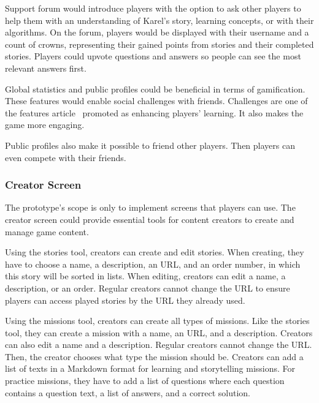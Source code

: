Support forum would introduce players with the option to ask other players to help them with an understanding of Karel's story, learning concepts, or with their algorithms.
On the forum, players would be displayed with their username and a count of crowns, representing their gained points from stories and their completed stories.
Players could upvote questions and answers so people can see the most relevant answers first.

Global statistics and public profiles could be beneficial in terms of gamification.
These features would enable social challenges with friends.
Challenges are one of the features article~\cite{nand_2019_engaging} promoted as enhancing players' learning.
It also makes the game more engaging.

Public profiles also make it possible to friend other players.
Then players can even compete with their friends.

\subsubsection{Creator Screen}

The prototype's scope is only to implement screens that players can use.
The creator screen could provide essential tools for content creators to create and manage game content.

Using the stories tool, creators can create and edit stories.
When creating, they have to choose a name, a description, an URL, and an order number, in which this story will be sorted in lists.
When editing, creators can edit a name, a description, or an order.
Regular creators cannot change the URL to ensure players can access played stories by the URL they already used.

Using the missions tool, creators can create all types of missions.
Like the stories tool, they can create a mission with a name, an URL, and a description.
Creators can also edit a name and a description.
Regular creators cannot change the URL.
Then, the creator chooses what type the mission should be.
Creators can add a list of texts in a Markdown format for learning and storytelling missions.
For practice missions, they have to add a list of questions where each question contains a question text, a list of answers, and a correct solution.  

